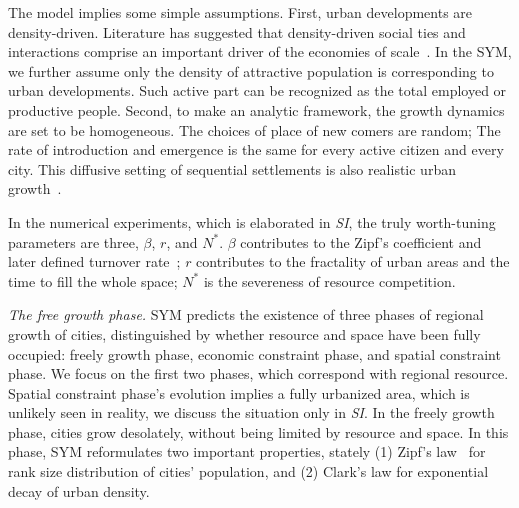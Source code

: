 \documentclass[reprint,unsortedaddress,amsmath,amssymb,aps,prl,showkeys]{revtex4-2}
\begin{document}
The model implies some simple assumptions. First, urban developments are density-driven. Literature has suggested that density-driven social ties and interactions comprise an important driver of the economies of scale~\cite{pan2013urban, girardin2009quantifying, batty1992form}. In the SYM, we further assume only the density of attractive population is corresponding to urban developments. Such active part can be recognized as the total employed or productive people. Second, to make an analytic framework, the growth dynamics are set to be homogeneous. The choices of place of new comers are random; The rate of introduction and emergence is the same for every active citizen and every city. This diffusive setting of sequential settlements is also realistic urban growth~\cite{RevModPhys.87.925}. 

In the numerical experiments, which is elaborated in \textit{SI}, the truly worth-tuning parameters are three, $\beta$, $r$, and $N^*$. $\beta$ contributes to the Zipf's coefficient and later defined turnover rate~\cite{rooney2006structural}; $r$ contributes to the fractality of urban areas and the time to fill the whole space; $N^*$ is the severeness of resource competition. 


\textit{The free growth phase.} SYM predicts the existence of three phases of regional growth of cities, distinguished by whether resource and space have been fully occupied: freely growth phase, economic constraint phase, and spatial constraint phase. We focus on the first two phases, which correspond with regional resource. Spatial constraint phase's evolution implies a fully urbanized area, which is unlikely seen in reality, we discuss the situation only in \textit{SI}. In the freely growth phase, cities grow desolately, without being limited by resource and space. In this phase, SYM reformulates two important properties, stately (1) Zipf's law~\cite{gabaix1999zipf's} for rank size distribution of cities' population, and (2) Clark's law for exponential decay of urban density\cite{clark1951urban}. 
\end{document}
